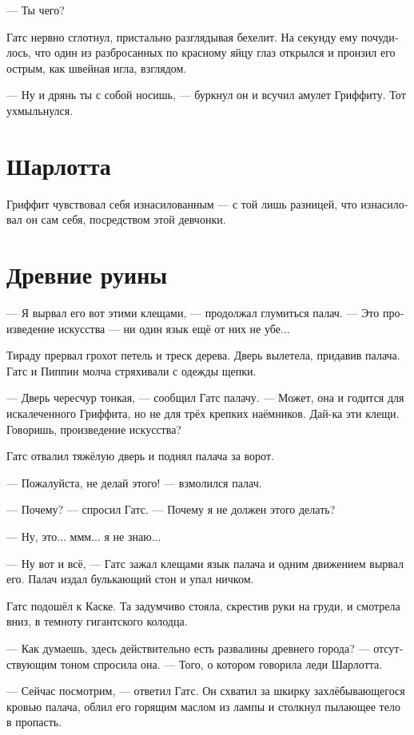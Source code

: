 \documentclass[a4paper,12pt,fleqn]{book}\usepackage{polyglossia}\setdefaultlanguage[babelshorthands=true]{russian}\setotherlanguage{english}\defaultfontfeatures{Ligatures=TeX,Mapping=tex-text}\usepackage{xcolor}\newcommand{\ml}[3]{#2}
\begin{document}
--- Ты чего?

Гатс нервно сглотнул, пристально разглядывая бехелит.
На секунду ему почудилось, что один из разбросанных по красному яйцу глаз открылся и пронзил его острым, как швейная игла, взглядом.

--- Ну и дрянь ты с собой носишь, --- буркнул он и всучил амулет Гриффиту.
Тот ухмыльнулся.

\section{Шарлотта}

Гриффит чувствовал себя изнасилованным --- с той лишь разницей, что изнасиловал он сам себя, посредством этой девчонки.

\section{Древние руины}

--- Я вырвал его вот этими клещами, --- продолжал глумиться палач.
--- Это произведение искусства --- ни один язык ещё от них не убе...

Тираду прервал грохот петель и треск дерева.
Дверь вылетела, придавив палача.
Гатс и Пиппин молча стряхивали с одежды щепки.

--- Дверь чересчур тонкая, --- сообщил Гатс палачу.
--- Может, она и годится для искалеченного Гриффита, но не для трёх крепких наёмников.
Дай-ка эти клещи.
Говоришь, произведение искусства?

Гатс отвалил тяжёлую дверь и поднял палача за ворот.

--- Пожалуйста, не делай этого! --- взмолился палач.

--- Почему? --- спросил Гатс.
--- Почему я не должен этого делать?

--- Ну, это... ммм... я не знаю...

--- Ну вот и всё, --- Гатс зажал клещами язык палача и одним движением вырвал его.
Палач издал булькающий стон и упал ничком.

Гатс подошёл к Каске.
Та задумчиво стояла, скрестив руки на груди, и смотрела вниз, в темноту гигантского колодца.

--- Как думаешь, здесь действительно есть развалины древнего города? --- отсутствующим тоном спросила она.
--- Того, о котором говорила леди Шарлотта.

--- Сейчас посмотрим, --- ответил Гатс.
Он схватил за шкирку захлёбывающегося кровью палача, облил его горящим маслом из лампы и столкнул пылающее тело в пропасть.
\end{document}
